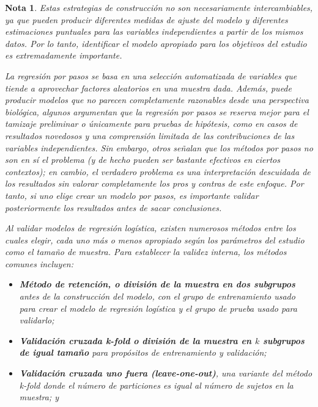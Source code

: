 \documentclass[12pt]{article}
\newtheorem{Note}{Nota}%
\begin{document}
\begin{Note}
Estas estrategias de construcci\'on no son necesariamente intercambiables, ya que pueden producir diferentes medidas de ajuste del modelo y diferentes estimaciones puntuales para las variables independientes a partir de los mismos datos. Por lo tanto, identificar el modelo apropiado para los objetivos del estudio es extremadamente importante.


La regresi\'on por pasos se basa en una selecci\'on automatizada de variables que tiende a aprovechar factores aleatorios en una muestra dada.  Adem\'as, puede producir modelos que no parecen completamente razonables desde una perspectiva biol\'ogica, algunos argumentan que la regresi\'on por pasos se reserva mejor para el tamizaje preliminar o \'unicamente para pruebas de hip\'otesis, como en casos de resultados novedosos y una comprensi\'on limitada de las contribuciones de las variables independientes. Sin embargo, otros se\~nalan que los m\'etodos por pasos no son en s\'i el problema (y de hecho pueden ser bastante efectivos en ciertos contextos); en cambio, el verdadero problema es una interpretaci\'on descuidada de los resultados sin valorar completamente los pros y contras de este enfoque. Por tanto, si uno elige crear un modelo por pasos, es importante validar posteriormente los resultados antes de sacar conclusiones.

Al validar modelos de regresi\'on log\'istica, existen numerosos m\'etodos entre los cuales elegir, cada uno m\'as o menos apropiado seg\'un los par\'ametros del estudio como el tama\~no de muestra. Para establecer la validez interna, los m\'etodos comunes incluyen: 

\begin{itemize}
\item[a) ] \textbf{M\'etodo de retenci\'on, o divisi\'on de la muestra en dos subgrupos} antes de la construcci\'on del modelo, con el grupo de \textit{entrenamiento} usado para crear el modelo de regresi\'on log\'istica y el grupo de \textit{prueba} usado para validarlo; \cite{altman2000, kohavi1995} 

\item[b) ] \textbf{Validaci\'on cruzada \textit{k-fold} o divisi\'on de la muestra en $k$ subgrupos de igual tama\~no} para prop\'ositos de entrenamiento y validaci\'on;\cite{kohavi1995} 

\item[c) ] \textbf{Validaci\'on cruzada \textit{uno fuera} (leave-one-out)}, una variante del m\'etodo \textit{k-fold} donde el n\'umero de particiones es igual al n\'umero de sujetos en la muestra;\cite{kohavi1995} y 


\end{itemize}
\end{Note}
\end{document}
